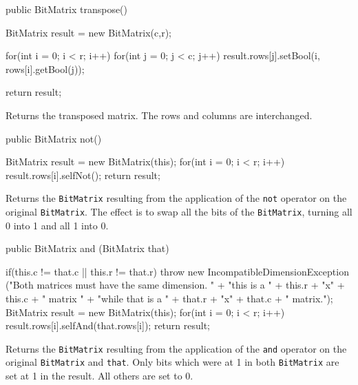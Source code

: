 \begin{code}

   public BitMatrix transpose() \begin{hide} {
      BitMatrix result = new BitMatrix(c,r);

      for(int i = 0; i < r; i++)
         for(int j = 0; j < c; j++)
            result.rows[j].setBool(i, rows[i].getBool(j));

      return result;
   } \end{hide}
\end{code}
\begin{tabb} Returns the transposed matrix. The rows and columns are
  interchanged.
\end{tabb}
\begin{htmlonly}
\end{htmlonly}
\begin{code}

   public BitMatrix not() \begin{hide} {
      BitMatrix result = new BitMatrix(this);
      for(int i = 0; i < r; i++)
         result.rows[i].selfNot();
      return result;
   } \end{hide}
\end{code}
\begin{tabb} Returns the \texttt{BitMatrix} resulting from the application of
  the \texttt{not} operator on the original \texttt{BitMatrix}. The effect is to
  swap all the bits of the \texttt{BitMatrix}, turning all 0 into 1 and all 1
  into 0.
\end{tabb}
\begin{htmlonly}
\end{htmlonly}
\begin{code}

   public BitMatrix and (BitMatrix that) \begin{hide} {
      if(this.c != that.c || this.r != that.r)
         throw new IncompatibleDimensionException
         ("Both matrices must have the same dimension. " +
          "this is a " + this.r + "x" + this.c + " matrix " +
          "while that is a " + that.r + "x" + that.c + " matrix.");
      BitMatrix result = new BitMatrix(this);
      for(int i = 0; i < r; i++)
         result.rows[i].selfAnd(that.rows[i]);
      return result;
   } \end{hide}
\end{code}
\begin{tabb} Returns the \texttt{BitMatrix} resulting from the application of
  the \texttt{and} operator on the original \texttt{BitMatrix} and \texttt{that}.
  Only bits which were at 1 in both \texttt{BitMatrix} are set at 1 in the
  result. All others are set to 0.
\end{tabb}
